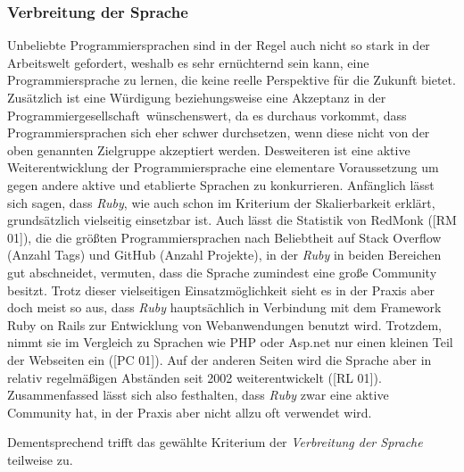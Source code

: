 \documentclass[12pt,DIV=14, version=first, BCOR=10mm,a4paper,twoside,parskip=half-,headsepline,headinclude]{scrartcl}
\begin{document}
\subsubsection{Verbreitung der Sprache}
\begin{flushleft}
Unbeliebte Programmiersprachen sind in der Regel auch nicht so stark in der Arbeitswelt gefordert, weshalb es sehr ernüchternd sein kann, eine Programmiersprache zu lernen, die keine reelle Perspektive für die Zukunft bietet. Zusätzlich ist eine Würdigung beziehungsweise eine Akzeptanz in der \glqq Programmiergesellschaft\grqq \, wünschenswert, da es durchaus vorkommt, dass Programmiersprachen sich eher schwer durchsetzen, wenn diese nicht von der oben genannten Zielgruppe akzeptiert werden. Desweiteren ist eine aktive Weiterentwicklung der Programmiersprache eine elementare Voraussetzung um gegen andere aktive und etablierte Sprachen zu konkurrieren.
Anfänglich lässt sich sagen, dass \textit{\glqq Ruby\grqq}, wie auch schon im Kriterium der Skalierbarkeit erklärt, grundsätzlich vielseitig einsetzbar ist. Auch lässt die Statistik von {\glqq RedMonk\grqq} ([RM 01]), die die größten Programmiersprachen nach Beliebtheit auf {\glqq Stack Overflow\grqq} (Anzahl Tags) und {\glqq GitHub\grqq} (Anzahl Projekte), in der \textit{\glqq Ruby\grqq} in beiden Bereichen gut abschneidet, vermuten, dass die Sprache zumindest eine große Community besitzt. Trotz dieser vielseitigen Einsatzmöglichkeit sieht es in der Praxis aber doch meist so aus, dass \textit{\glqq Ruby\grqq} hauptsächlich in Verbindung mit dem Framework {\glqq Ruby on Rails\grqq} zur Entwicklung von Webanwendungen benutzt wird. Trotzdem, nimmt sie im Vergleich zu Sprachen wie {\glqq PHP\grqq} oder {\glqq Asp.net\grqq} nur einen kleinen Teil der Webseiten ein ([PC 01]). Auf der anderen Seiten wird die Sprache aber in relativ regelmäßigen Abständen seit 2002 weiterentwickelt ([RL 01]). Zusammenfassed lässt sich also festhalten, dass \textit{\glqq Ruby\grqq} zwar eine aktive Community hat, in der Praxis aber nicht allzu oft verwendet wird.

Dementsprechend trifft das gewählte Kriterium der \textit{Verbreitung der Sprache} teilweise zu.
\end{flushleft}
\end{document}
